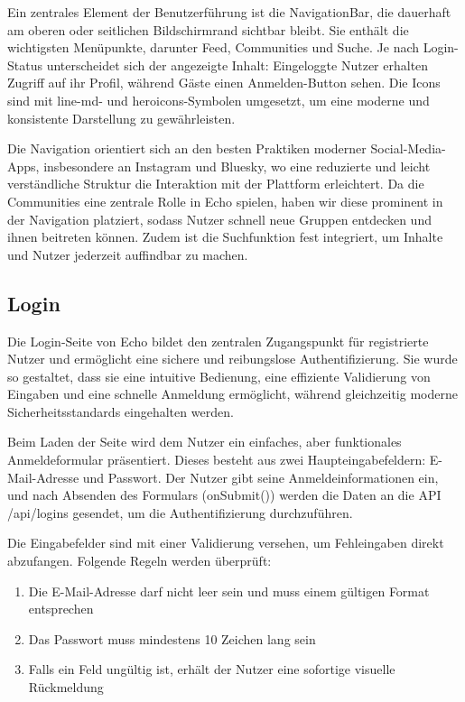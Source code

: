 \documentclass[a4paper,12pt]{article}
\begin{document}
Ein zentrales Element der Benutzerführung ist die NavigationBar, die dauerhaft
am oberen oder seitlichen Bildschirmrand sichtbar bleibt. Sie enthält die
wichtigsten Menüpunkte, darunter Feed, Communities und Suche. Je nach
Login-Status unterscheidet sich der angezeigte Inhalt: Eingeloggte Nutzer
erhalten Zugriff auf ihr Profil, während Gäste einen Anmelden-Button sehen. Die
Icons sind mit line-md- und heroicons-Symbolen umgesetzt, um eine moderne und
konsistente Darstellung zu gewährleisten.

Die Navigation orientiert sich an den besten Praktiken moderner
Social-Media-Apps, insbesondere an Instagram und Bluesky, wo eine reduzierte
und leicht verständliche Struktur die Interaktion mit der Plattform
erleichtert. Da die Communities eine zentrale Rolle in Echo spielen, haben wir
diese prominent in der Navigation platziert, sodass Nutzer schnell neue Gruppen
entdecken und ihnen beitreten können. Zudem ist die Suchfunktion fest
integriert, um Inhalte und Nutzer jederzeit auffindbar zu machen.

\subsection{Login}
Die Login-Seite von Echo bildet den zentralen Zugangspunkt für registrierte
Nutzer und ermöglicht eine sichere und reibungslose Authentifizierung. Sie
wurde so gestaltet, dass sie eine intuitive Bedienung, eine effiziente
Validierung von Eingaben und eine schnelle Anmeldung ermöglicht, während
gleichzeitig moderne Sicherheitsstandards eingehalten werden.

Beim Laden der Seite wird dem Nutzer ein einfaches, aber funktionales
Anmeldeformular präsentiert. Dieses besteht aus zwei Haupteingabefeldern:
E-Mail-Adresse und Passwort. Der Nutzer gibt seine Anmeldeinformationen ein,
und nach Absenden des Formulars (onSubmit()) werden die Daten an die API
/api/logins gesendet, um die Authentifizierung durchzuführen.

Die Eingabefelder sind mit einer Validierung versehen, um Fehleingaben direkt
abzufangen. Folgende Regeln werden überprüft:

\begin{enumerate}
    \item Die E-Mail-Adresse darf nicht leer sein und muss einem gültigen
    Format entsprechen
    \item Das Passwort muss mindestens 10 Zeichen lang sein
    \item Falls ein Feld ungültig ist, erhält der Nutzer eine sofortige
        visuelle Rückmeldung
\end{enumerate}
\end{document}
